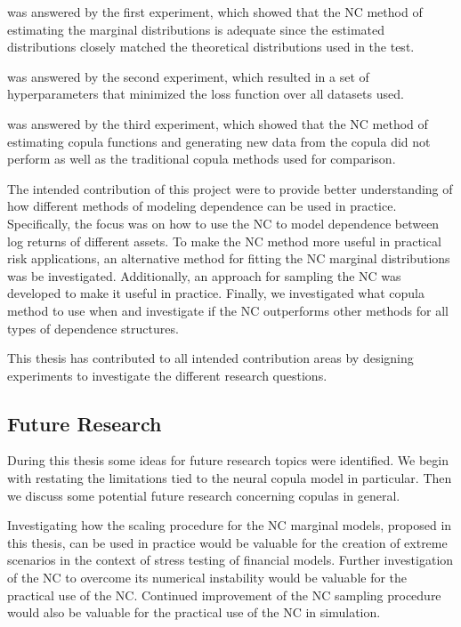 \RQone  was answered by the first experiment, which showed that the \gls{NC} method of estimating the marginal distributions is adequate since the estimated distributions closely matched the theoretical distributions used in the test. 

\RQtwo  was answered by the second experiment, which resulted in a set of hyperparameters that minimized the loss function over all datasets used. 

\RQthree  was answered by the third experiment, which showed that the \gls{NC} method of estimating copula functions and generating new data from the copula did not perform as well as the traditional copula methods used for comparison.   


The intended contribution of this project were to provide better understanding of how different methods of modeling dependence can be used in practice. Specifically, the focus was on how to use the \gls{NC} to model dependence between log returns of different assets. To make the \gls{NC} method more useful in practical risk applications, an alternative method for fitting the \gls{NC} marginal distributions was be investigated. Additionally, an approach for sampling the \gls{NC} was developed to make it useful in practice. Finally, we investigated what copula method to use when and investigate if the \gls{NC} outperforms other methods for all types of dependence structures. 

This thesis has contributed to all intended contribution areas by designing experiments to investigate the different research questions. 

\subsection{Future Research}



During this thesis some ideas for future research topics were identified. We begin with restating the limitations tied to the neural copula model in particular. Then we discuss some potential future research concerning copulas in general.

Investigating how the scaling procedure for the \gls{NC} marginal models, proposed in this thesis, can be used in practice would be valuable for the creation of extreme scenarios in the context of stress testing of financial models. Further investigation of the \gls{NC} to overcome its numerical instability would be valuable for the practical use of the \gls{NC}. Continued improvement of the \gls{NC} sampling procedure would also be valuable for the practical use of the \gls{NC} in simulation.   



